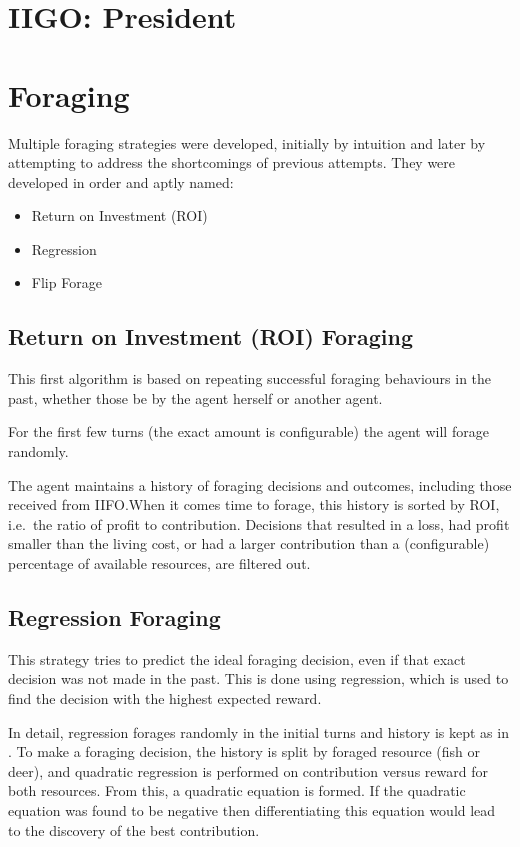 \section{IIGO: President}

\section{Foraging}
Multiple foraging strategies were developed, initially by intuition and later by attempting to address the shortcomings of previous attempts. They were developed in order and aptly named:
\begin{itemize}
    \item Return on Investment (ROI)
    \item Regression
    \item Flip Forage
\end{itemize}


\subsection{Return on Investment (ROI) Foraging}%
\label{sec:forage-roi}

This first algorithm is based on repeating successful foraging behaviours in the past, whether those be by the agent herself or another agent.

For the first few turns (the exact amount is configurable) the agent will forage randomly.

The agent maintains a history of foraging decisions and outcomes, including those received from IIFO.\@ When it comes time to forage, this history is sorted by ROI, i.e.\ the ratio of profit to contribution. Decisions that resulted in a loss, had profit smaller than the living cost, or had a larger contribution than a (configurable) percentage of available resources, are filtered out.

\subsection{Regression Foraging}%
\label{sec:forage-regression}

This strategy tries to predict the ideal foraging decision, even if that exact decision was not made in the past. This is done using regression, which is used to find the decision with the highest expected reward.

In detail, regression forages randomly in the initial turns and history is kept as in . To make a foraging decision, the history is split by foraged resource (fish or deer), and quadratic regression is performed on contribution versus reward for both resources. From this, a quadratic equation is formed. If the quadratic equation was found to be negative then differentiating this equation would lead to the discovery of the best contribution. 

